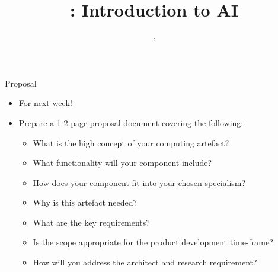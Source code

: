 
\usepackage{../../beamerthemeFalmouthGamesAcademy}
\usepackage{multimedia}
\graphicspath{ {../../} }


\usepackage[normalem]{ulem}
\usepackage{wasysym}

\usepackage{pifont}%
\newcommand{\cmark}{\ding{51}}%
\newcommand{\xmark}{\ding{55}}%

\usepackage{algpseudocode}

\usepackage{pdfpages}

\usetikzlibrary{arrows,automata}




\title{\sessionnumber: Introduction to AI}
\subtitle{\modulecode: \moduletitle}

\frame{\titlepage} 

\begin{frame}{Proposal}
        \begin{itemize}
                \pause\item For next week!
                \pause\item Prepare a 1-2 page proposal document covering the following:
                \begin{itemize}
                        \pause\item What is the high concept of your computing artefact?
                        \pause\item What functionality will your component include?
                        \pause\item How does your component fit into your chosen specialism?
                        \pause\item Why is this artefact needed?
                        \pause\item What are the key requirements?
                        \pause\item Is the scope appropriate for the product development time-frame?
                        \pause\item How will you address the architect and research requirement?
                \end{itemize}
        \end{itemize}
\end{frame}


